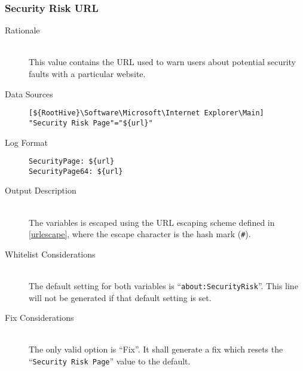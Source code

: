 \subsubsection{Security Risk URL}
\begin{description}
\item[Rationale]  \hfill \\ This value contains the URL used to warn users about
potential security faults with a particular website.

\item[Data Sources] \hfill
\vspace{-\baselineskip}
\begin{verbatim}
[${RootHive}\Software\Microsoft\Internet Explorer\Main]
"Security Risk Page"="${url}"
\end{verbatim}
\item[Log Format] \hfill
\vspace{-\baselineskip}
\begin{verbatim} 
SecurityPage: ${url}
SecurityPage64: ${url}
\end{verbatim}
\item[Output Description] \hfill \\
The variables  is escaped using the URL escaping
scheme defined in \ref{urlescape}, where the escape character is the hash mark
(\verb|#|).
\item[Whitelist Considerations] \hfill \\
The default setting for both variables is ``\verb|about:SecurityRisk|''. This
line will not be generated if that default setting is set.
\item[Fix Considerations] \hfill \\
The only valid option is ``Fix''. It shall generate a fix which resets the
``\verb|Security Risk Page|'' value to the default.
\end{description}

